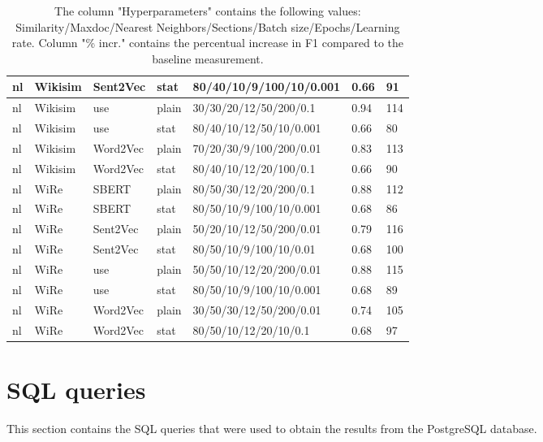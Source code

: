 \begin{table}[!ht]
\begin{tabular}{l|l|l|l|l|l|l}
nl & Wikisim & Sent2Vec & stat & 80/40/10/9/100/10/0.001 & 0.66 & 91 \\ \hline
nl & Wikisim & use & plain & 30/30/20/12/50/200/0.1 & 0.94 & 114 \\ \hline
nl & Wikisim & use & stat & 80/40/10/12/50/10/0.001 & 0.66 & 80 \\ \hline
nl & Wikisim & Word2Vec & plain & 70/20/30/9/100/200/0.01 & 0.83 & 113 \\ \hline
nl & Wikisim & Word2Vec & stat & 80/40/10/12/20/100/0.1 & 0.66 & 90 \\ \hline
nl & WiRe & SBERT & plain & 80/50/30/12/20/200/0.1 & 0.88 & 112 \\ \hline
nl & WiRe & SBERT & stat & 80/50/10/9/100/10/0.001 & 0.68 & 86 \\ \hline
nl & WiRe & Sent2Vec & plain & 50/20/10/12/50/200/0.01 & 0.79 & 116 \\ \hline
nl & WiRe & Sent2Vec & stat & 80/50/10/9/100/10/0.01 & 0.68 & 100 \\ \hline
nl & WiRe & use & plain & 50/50/10/12/20/200/0.01 & 0.88 & 115 \\ \hline
nl & WiRe & use & stat & 80/50/10/9/100/10/0.001 & 0.68 & 89 \\ \hline
nl & WiRe & Word2Vec & plain & 30/50/30/12/50/200/0.01 & 0.74 & 105 \\ \hline
nl & WiRe & Word2Vec & stat & 80/50/10/12/20/10/0.1 & 0.68 & 97 \\ \hline
    \end{tabular}
    \caption{The column "Hyperparameters" contains the following values: Similarity/Maxdoc/Nearest Neighbors/Sections/Batch size/Epochs/Learning rate. Column "\% incr." contains the percentual increase in F1 compared to the baseline measurement.}
    \label{tabMaxF1}
\end{table}


\section{SQL queries}
This section contains the SQL queries that were used to obtain the results from the PostgreSQL database.\\

